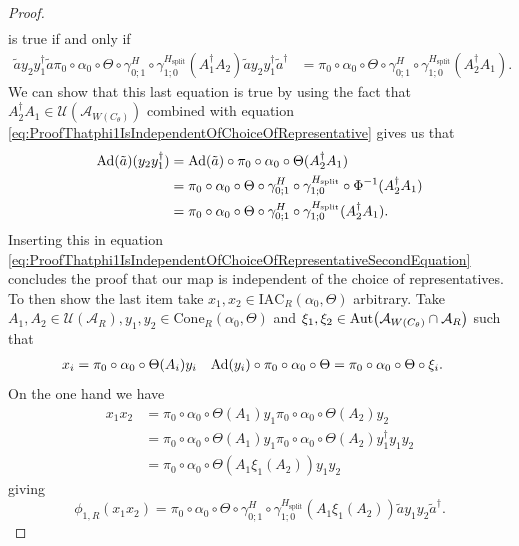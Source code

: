 \documentclass[12pt,a4paper,twoside]{article}
\newcommand{\IAC}{\textrm{IAC}}
\let\originalleft\left
\let\originalright\right
\renewcommand{\left}{\mathopen{}\mathclose\bgroup\originalleft}
\renewcommand{\right}{\aftergroup\egroup\originalright}
\newcommand{\UU}{\mathcal U}
\renewcommand{\AA}{\mathcal A}
\newcommand{\Ad}[1]{\textrm{Ad}\left(#1\right)}
\newcommand{\Aut}[1]{\textrm{Aut}\left(#1\right)}
\theoremstyle{definition}
\numberwithin{equation}{section}
\begin{document}
\begin{proof}
\begin{align}
\end{align}
is true if and only if
\begin{align}
	\label{eq:ProofThatphi1IsIndependentOfChoiceOfRepresentativeSecondEquation}
	\tilde{a}y_2 y_1^\dagger \tilde{a}\pi_0\circ\alpha_0\circ\Theta\circ\gamma^H_{0;1}\circ\gamma^{H_\text{split}}_{1;0}(A_1^\dagger A_2) \tilde{a} y_2 y_1^\dagger \tilde{a}^\dagger&=\pi_0\circ\alpha_0\circ\Theta\circ\gamma^H_{0;1}\circ\gamma^{H_\text{split}}_{1;0}(A_2^\dagger A_1) .
\end{align}
We can show that this last equation is true by using the fact that $A_2^\dagger A_1\in\UU(\AA_{W(C_\theta)})$ combined with equation \eqref{eq:ProofThatphi1IsIndependentOfChoiceOfRepresentative} gives us that
\begin{align}
	\Ad{\tilde{a}}(y_2 y_1^\dagger)&=\Ad{\tilde{a}}\circ\pi_0\circ\alpha_0\circ\Theta(A_2^\dagger A_1)\\
	&=\pi_0\circ\alpha_0\circ\Theta\circ\gamma^H_{0;1}\circ\gamma^{H_{\text{split}}}_{1;0}\circ\Phi^{-1}(A_2^\dagger A_1)\\
	&=\pi_0\circ\alpha_0\circ\Theta\circ\gamma^H_{0;1}\circ\gamma^{H_{\text{split}}}_{1;0}(A_2^\dagger A_1).
\end{align}
Inserting this in equation \eqref{eq:ProofThatphi1IsIndependentOfChoiceOfRepresentativeSecondEquation} concludes the proof that our map is independent of the choice of representatives. To then show the last item take $x_1,x_2\in \IAC_R(\alpha_0,\Theta)$ arbitrary. Take $A_1,A_2\in\UU(\AA_R),y_1,y_2\in \textrm{Cone}_R(\alpha_0,\Theta)$ and $\xi_1,\xi_2\in\Aut{\AA_{W(C_\theta)}\cap\AA_R}$ such that
	\begin{align}
		x_i&=\pi_0\circ\alpha_0\circ\Theta(A_i)y_i&\Ad{y_i}\circ\pi_0\circ\alpha_0\circ\Theta&=\pi_0\circ\alpha_0\circ\Theta\circ\xi_i.
	\end{align}
	On the one hand we have
	\begin{align}
		x_1x_2&=\pi_0\circ\alpha_0\circ\Theta(A_1)y_1\pi_0\circ\alpha_0\circ\Theta(A_2)y_2\\
		&=\pi_0\circ\alpha_0\circ\Theta(A_1)y_1\pi_0\circ\alpha_0\circ\Theta(A_2)y_1^{\dagger}y_1y_2\\
		&=\pi_0\circ\alpha_0\circ\Theta(A_1\xi_1(A_2))y_1y_2
	\end{align}
	giving
	\begin{equation}
		\phi_{1,R}(x_1x_2)=\pi_0\circ\alpha_0\circ\Theta\circ\gamma^H_{0;1}\circ\gamma^{H_\text{split}}_{1;0}(A_1\xi_1(A_2))\tilde{a}y_1y_2\tilde{a}^\dagger.
	\end{equation}

\end{proof}
\end{document}
